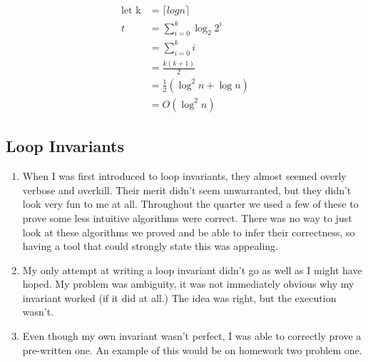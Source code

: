 \documentclass[a4paper,12pt]{article}
\newenvironment{indentpar}[1]%
{\begin{list}{}%
    {\setlength{\leftmargin}{#1}}%
  \item[]%
  }
  {\end{list}}
\begin{document}
\begin{enumerate}[]
\begin{indentpar}{0.5in}
    \begin{align*}
      \text{let k}& = \lceil log n \rceil\\
        t& = \sum_{i=0}^k \log_2 2^i\\
        & = \sum_{i=0}^k i\\
        & = \frac{k(k+1)}{2}\\
        & = \frac{1}{2}\left(\log^2 n + \log n\right) \\
        & = O(\log^2 n)
    \end{align*}
  \end{indentpar}

\end{enumerate}

\subsection*{Loop Invariants}

\begin{enumerate}[]

\item When I was first introduced to loop invariants, they almost
  seemed overly verbose and overkill. Their merit didn't seem
  unwarranted, but they didn't look very fun to me at all. Throughout
  the quarter we used a few of these to prove some less intuitive
  algorithms were correct. There was no way to just look at these
  algorithms we proved and be able to infer their correctness, so
  having a tool that could strongly state this was appealing.

\item My only attempt at writing a loop invariant didn't go as well as
  I might have hoped. My problem was ambiguity, it was not immediately
  obvious why my invariant worked (if it did at all.) The idea was
  right, but the execution wasn't.

\item Even though my own invariant wasn't perfect, I was able to
  correctly prove a pre-written one. An example of this would be on
  homework two problem one.
  
\end{enumerate}
\end{document}
